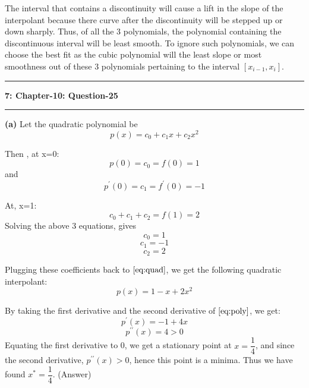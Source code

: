 \documentclass{article}
\newcommand\question[2]{\vspace{.25in}\hrule\textbf{#1: #2}\hrule\vspace{.10in}}
\renewcommand\part[1]{\vspace{.10in}\textbf{(#1)}}
\begin{document}
The interval that contains a discontinuity will cause a lift in the slope of the interpolant because there curve after the discontinuity will be stepped up or down sharply. Thus, of all the 3 polynomials, the polynomial containing the discontinuous interval will be least smooth. To ignore such polynomials, we can choose the best fit as the cubic polynomial will the least slope or most smoothness out of these 3 polynomials pertaining to the interval $[x_{i-1},x_i]$. \newline

\question{7}{Chapter-10: Question-25}

\part{a} Let the quadratic polynomial be 
\begin{equation}
	p(x) = c_0 + c_1 x + c_2 x^2
	\label{eq:quad}
\end{equation}

Then , at x=0:
\[ p(0) = c_0 = f(0) = 1 \]
and
\[ p^\prime(0) = c_1 = f^\prime(0) = -1\]

At, x=1:
\[ c_0 + c_1 + c_2 = f(1) = 2 \]
Solving the above 3 equations, gives
\[ c_0 = 1\]
\[ c_1 = -1\]
\[ c_2 = 2\]

Plugging these coefficients back to $\eqref{eq:quad}$, we get the following quadratic interpolant:
\begin{equation}
	p(x) = 1 - x + 2x^2
	\label{eq:poly}
\end{equation}

By taking the first derivative and the second derivative of $\eqref{eq:poly}$, we get:
\[p^\prime(x) = -1 + 4x\]
\[p^{\prime\prime}(x) = 4 > 0\]
Equating the first derivative to 0, we get a stationary point at $x=\dfrac{1}{4}$, and since the second derivative, $p^{\prime\prime}(x) > 0$, hence this point is a minima. Thus we have found  $x^* = \dfrac{1}{4}$. (Answer) \newline
\end{document}
